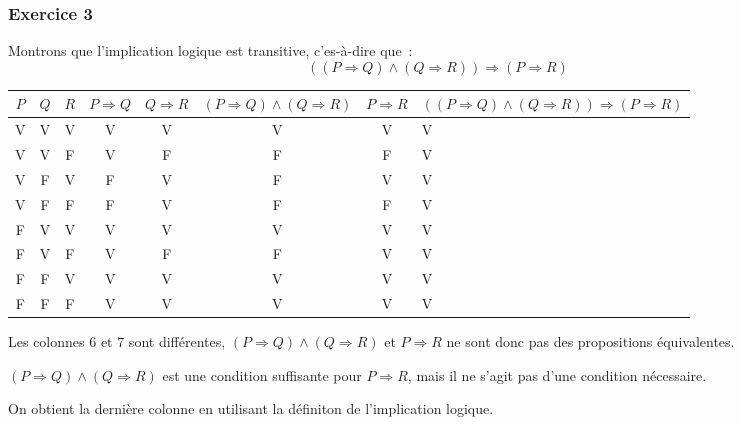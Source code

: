 \documentclass[10pt,notheorems]{beamer}
\theoremstyle{plain}
\theoremstyle{definition} %
\begin{document}
\begin{frame}
  \frametitle{Exercice 3}
  \fontsize{8}{10}\selectfont

  Montrons que l'implication logique est transitive, c'es-à-dire que~:
    \[
      ((P \Rightarrow Q) \land (Q \Rightarrow R)) \Rightarrow (P \Rightarrow R)
    \]
    \fontsize{4}{5}\selectfont
    \begin{table}[H]
    \begin{tabular}[H]{|ccc|ccccg|}
      \hline
      $P$ & $Q$ & $R$ & $P\Rightarrow Q$ & $Q\Rightarrow R$ & $(P\Rightarrow Q) \land (Q\Rightarrow R)$ & $P\Rightarrow R$ & $((P\Rightarrow Q) \land (Q\Rightarrow R))\Rightarrow (P\Rightarrow R)$\\ \hline
      V & V & V & V & V & V & V & V \\
      V & V & F & V & F & F & F & V \\
      V & F & V & F & V & F & V & V \\
      V & F & F & F & V & F & F & V \\
      F & V & V & V & V & V & V & V \\
      F & V & F & V & F & F & V & V \\
      F & F & V & V & V & V & V & V \\
      F & F & F & V & V & V & V & V \\
      \hline\hline
    \end{tabular}
  \end{table}
  \fontsize{8}{10}\selectfont
  \bigskip
  {\tiny \textdbend} Les colonnes 6 et 7 sont différentes, $(P \Rightarrow Q) \land (Q \Rightarrow R)$ et $P \Rightarrow R$ ne sont donc pas des propositions équivalentes.\newline

  $(P \Rightarrow Q) \land (Q \Rightarrow R)$ est une condition suffisante pour $P \Rightarrow R$, mais il ne s'agit pas d'une condition nécessaire.\newline

  On obtient la dernière colonne en utilisant la définiton de l'implication logique.

\end{frame}
\end{document}

